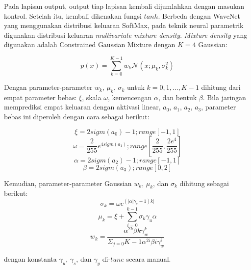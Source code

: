 Pada lapisan output, output tiap lapisan kembali dijumlahkan dengan masukan kontrol. Setelah itu, kembali dikenakan fungsi $tanh$\parencite{bonada2017singing}. Berbeda dengan WaveNet \parencite{Oord2016WaveNetAG} yang menggunakan distribusi keluaran SoftMax, pada teknik neural parametrik digunakan distribusi keluaran \textit{multivariate mixture density}. \textit{Mixture density} yang digunakan adalah Constrained Gaussian Mixture dengan $K=4$ Gaussian: \parencite{bonada2017singing}

\begin{equation}
    p(x) = \sum\limits_{k=0}^{K-1}w_k\mathcal{N}(x;\mu_k,\sigma_k^2)
\end{equation}\label{eq-gated-activation}

Dengan parameter-parameter $w_k$, $\mu_k$, $\sigma_k$ untuk $k=0,1,...,K-1$ dihitung dari empat parameter bebas: $\xi$, skala $\omega$, kemencengan $\alpha$, dan bentuk $\beta$. Bila jaringan memprediksi empat keluaran dengan aktivasi linear, $a_0$, $a_1$, $a_2$, $a_3$, parameter bebas ini diperoleh dengan cara sebagai berikut: \parencite{bonada2017singing}

\begin{equation}
    \xi = 2 sigm(a_0)-1; range[-1,1]
\end{equation}
\begin{equation}
    \omega = \dfrac{2}{255}e^{4sigm(a_1)}; range[\dfrac{2}{255}, \dfrac{2 e^4}{255}]
\end{equation}
\begin{equation}
    \alpha = 2 sigm(a_2)-1; range[-1,1]
\end{equation}
\begin{equation}
    \beta = 2 sigm(a_3); range[0,2]
\end{equation}

Kemudian, parameter-parameter Gaussian $w_k$, $\mu_k$, dan $\sigma_k$ dihitung sebagai berikut:\parencite{bonada2017singing}
\begin{equation}
    \sigma_k = \omega e^{(|\alpha|\gamma_s-1)k|}
\end{equation}
\begin{equation}
    \mu_k = \xi + \sum\limits_{i=0}^{k-1}\sigma_k\gamma_u\alpha
\end{equation}
\begin{equation}
    w_k = \dfrac{\alpha^{2k}\beta{k}\gamma_w^k}{\Sigma_{j=0}{K-1}\alpha^{2i}\beta{i}\gamma_w^i}
\end{equation}

dengan konstanta $\gamma_u$, $\gamma_s$, dan $\gamma_y$ di-$tune$ secara manual.





